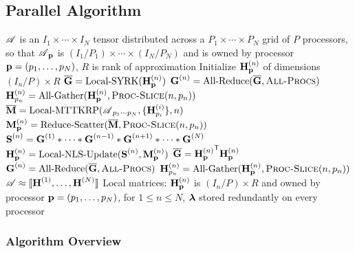 \subsection{Parallel Algorithm}

\begin{algorithm}
\caption{$\CP = \text{Par-NNCP}(\TA,R)$}
\label{alg:Par-NNCP-short}
\begin{algorithmic}[1]
\Require $\TA$ is an $I_1\times \cdots \times I_N$ tensor distributed across a $P_1\times \cdots \times P_N$ grid of $P$ processors, so that $\TA_{\V{p}}$ is $(I_1/P_1)\times \cdots \times (I_N/P_N)$ and is owned by processor $\V{p}=(p_1,\dots,p_N)$, $R$ is rank of approximation
	\State Initialize $\Mn{H}{n}_{\V{p}}$ of dimensions $(I_n/P)\times R$ 
	\State $\M[\overline]{G} = \text{Local-SYRK}(\Mn{H}{n}_{\V{p}})$
	\State $\Mn{G}{n} = \text{All-Reduce}(\M[\overline]{G},\textsc{All-Procs})$
	\State $\Mn{H}{n}_{p_n} = \text{All-Gather}(\Mn{H}{n}_{\V{p}},\textsc{Proc-Slice}(n,\VE{p}{n}))$
\EndFor
\State {}
	\label{line:while}
	\State {}
		\label{line:for}
		\State {}
		\State $\M[\overline]{M} = \text{Local-MTTKRP}(\TA_{p_1\cdots p_N},\{\Mn{H}{i}_{p_i}\},n)$
			\label{line:locMTTKRP}
		\State $\Mn{M}{n}_{\V{p}} = \text{Reduce-Scatter}(\M[\overline]{M},\textsc{Proc-Slice}(n,\VE{p}{n}))$ 
			\label{line:reduce-scatter}
		\State $\Mn{S}{n} = \Mn{G}{1} \Hada \cdots \Hada \Mn{G}{n-1} \Hada \Mn{G}{n+1} \Hada \cdots \Hada \Mn{G}{N}$
			\label{line:hadamard}
		\State $\Mn{H}{n}_{\V{p}} = \text{Local-NLS-Update}(\Mn{S}{n},\Mn{M}{n}_{\V{p}})$
			\label{line:locNLS}
		\State {}
		\State $\M[\overline]{G} = {\Mn{H}{n}_{\V{p}}}^\Tra\Mn{H}{n}_{\V{p}}$
			\label{line:locSYRK}
		\State $\Mn{G}{n} = \text{All-Reduce}(\M[\overline]{G},\textsc{All-Procs})$
			\label{line:all-reduce}
		\State $\Mn{H}{n}_{p_n} = \text{All-Gather}(\Mn{H}{n}_{\V{p}},\textsc{Proc-Slice}(n,\VE{p}{n}))$
			\label{line:all-gather}
	\EndFor 
		\label{line:endfor}
\EndWhile
	\label{line:endwhile}
\Ensure $\TA \approx \CP$
\Ensure Local matrices: $\Mn{H}{n}_{\V{p}}$ is $(I_n/P)\times R$ and owned by processor $\V{p}=(p_1,\dots,p_N)$, for $1\leq n \leq N$, $\V{\lambda}$ stored redundantly on every processor
\end{algorithmic}
\end{algorithm}

\subsubsection{Algorithm Overview}


